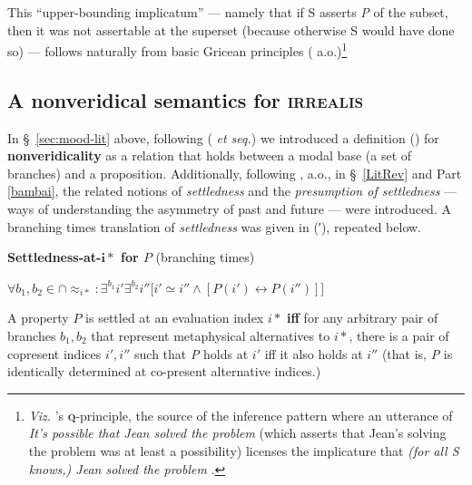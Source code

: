This ``upper-bounding implicatum'' --- namely that if \textsf{S} asserts \textit{P} of the subset, then it was not assertable at the superset (because otherwise \textsf{S} would have done so) --- follows naturally from basic Gricean principles (\citealp[see][]{Horn1984} a.o.)\footnote{\textit{Viz.} \citeauthor{Horn1984}'s \textbf{\textsc{q}}-principle, the source of the inference pattern where an utterance of \textit{It's possible that Jean solved the problem} (which asserts that Jean's solving the problem was at least a possibility) licenses the implicature that \textit{(for all \textsf{S} knows,) Jean solved the problem} \citeyearpar[15]{Horn1984}.}

\subsection{A nonveridical semantics for \textsc{irrealis}}

In \S~\ref{sec:mood-lit} above, following \citeauthor{Giannakidou1995} (\citeyear{Giannakidou1995,Giannakidou1998} \textit{et seq.}) we introduced a definition () for \textbf{nonveridicality} as a relation that holds between a modal base (a set of branches) and a proposition. Additionally, following \citet*{Condoravdi2002,Kaufmann2005,Kaufmann2006}, a.o., in \S~\ref{LitRev} and Part \ref{bambai}, the related notions of \textit{settledness} and the \textit{presumption of settledness} --- ways of understanding the asymmetry of past and future --- were introduced. A branching times translation of \textit{settledness} was given in (′), repeated below.


\pex\textbf{Settledness-at-$ \boldsymbol{i*} $ for $ \boldsymbol{\mathit P} $} (branching times)

\nobreak$\forall b_1,b_2\in\cap{\approx_{i*}}:\exists^{b_1}i'\exists^{b_2}i''\big[i'\simeq i''\wedge [P(i')\leftrightarrow P(i'')]\big]$
%

A property $ P $ is settled at an evaluation index $ i* $ \textbf{iff} for any arbitrary pair of branches $ b_1,b_2 $ that represent metaphysical alternatives to $ i* $, there is a pair of copresent indices $ i',i'' $ such that \textit{P} holds at $ i' $ iff it also holds at $ i'' $ (that is, \textit{P} is identically determined at co-present alternative indices.)


